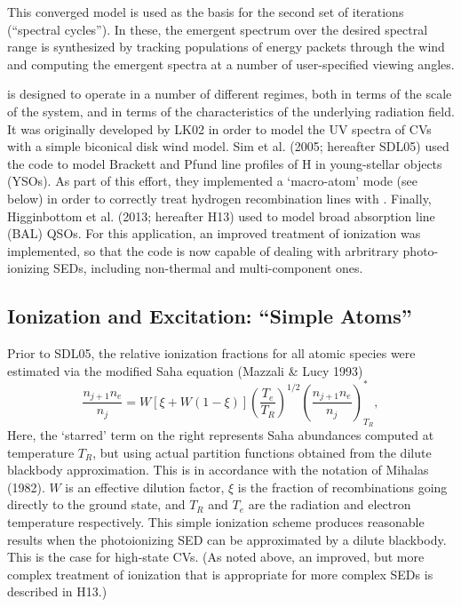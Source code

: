 \documentclass[preprint, a4paper, 11pt]{aastex}
\begin{document}
This converged model is used as the basis for the second set of
iterations (``spectral cycles''). In these, the emergent spectrum over
the desired spectral range is synthesized by tracking populations of
energy packets through the wind and computing the emergent spectra at
a number of user-specified viewing angles.  

\py is designed to operate in a number of different
regimes, both in terms of the scale of the system, and in terms of the
characteristics of the underlying radiation field.
It was originally developed by LK02 in order to model the UV spectra
of CVs with a simple biconical disk wind model. Sim et al. (2005;
hereafter SDL05)\nocite{simmacro2005} used the code to model Brackett
and Pfund line profiles of H in young-stellar objects (YSOs). As part
of this effort, they implemented a `macro-atom' mode (see below) in
order to correctly treat hydrogen recombination lines with
\py. Finally, Higginbottom et al.\nocite{higginbottom2013} (2013;
hereafter H13) used \py to model broad absorption line (BAL) QSOs. For
this application, an improved treatment of ionization was implemented,
so that the code is now capable of dealing with arbritrary
photo-ionizing SEDs, including non-thermal and multi-component ones. 

\subsection{Ionization and Excitation: ``Simple Atoms''}

Prior to SDL05, the relative ionization fractions for all atomic
species were estimated via the modified Saha equation (Mazzali \&
Lucy 1993)  
\begin{equation}
\frac{n_{j+1} n_e}{n_j} = W [\xi + W(1-\xi)]
\left(\frac{T_e}{T_R}\right)^{1/2}
\left(\frac{n_{j+1}n_e}{n_j}\right)^*_{T_R}, \label{ionization}
\end{equation}
Here, the `starred' term on the right represents Saha
abundances computed at temperature $T_R$, but
using actual partition functions obtained 
from the dilute blackbody approximation.
This is in accordance with the notation of Mihalas (1982).  
$W$ is an effective dilution factor, $\xi$ is the
fraction of recombinations going directly to the ground state, and
$T_R$ and $T_e$ are the radiation and electron temperature
respectively. This simple ionization scheme produces reasonable
results when the photoionizing SED can be approximated by a dilute
blackbody. This is the case for high-state CVs. (As noted above, an
improved, but more complex treatment of ionization that is appropriate
for more complex SEDs is described in H13.) 
\end{document}
